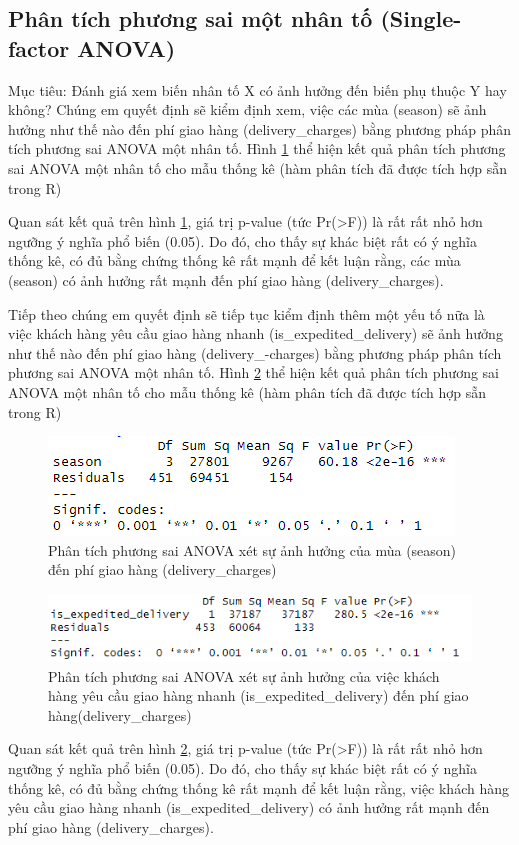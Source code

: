 \subsection{Phân tích phương sai một nhân tố (Single-factor ANOVA)} \label{anova1}
Mục tiêu: Đánh giá xem biến nhân tố X có ảnh hưởng đến biến phụ thuộc Y hay không?
Chúng em quyết định sẽ kiểm định xem, việc các mùa (season) sẽ ảnh hưởng như thế nào đến phí giao hàng (delivery\_charges) bằng
phương pháp phân tích phương sai ANOVA một nhân tố. Hình \ref{fig:5.1} thể hiện kết quả phân tích phương sai ANOVA một nhân tố cho mẫu thống kê (hàm phân tích đã được tích hợp sẵn trong R)

Quan sát kết quả trên hình \ref{fig:5.1}, giá trị p-value (tức Pr(>F)) là rất rất nhỏ hơn ngưỡng ý nghĩa phổ biến (0.05). Do đó, cho thấy sự
khác biệt rất có ý nghĩa thống kê, có đủ bằng chứng thống kê rất mạnh để kết luận rằng, các mùa (season) có ảnh hưởng rất mạnh đến phí giao hàng (delivery\_charges).

Tiếp theo chúng em quyết định sẽ tiếp tục kiểm định thêm một yếu tố nữa là việc khách hàng yêu cầu giao hàng nhanh (is\_expedited\_delivery) sẽ ảnh hưởng như thế nào đến phí giao hàng (delivery\_-charges) bằng phương pháp phân tích phương sai ANOVA một nhân tố. Hình \ref{fig:5.2} thể hiện kết quả phân tích phương sai ANOVA một nhân tố cho mẫu thống kê (hàm phân tích đã được tích hợp sẵn trong R)
\begin{figure}[!htbp]
    \centering
    \includegraphics[width=0.6\linewidth]{graphics/5.3.1.png}
    \caption{Phân tích phương sai ANOVA xét sự ảnh hưởng của mùa (season) đến phí giao hàng (delivery\_charges)}
    \label{fig:5.1}
\end{figure}

\begin{figure}[!htbp]
    \centering
    \includegraphics[width=0.7\linewidth]{graphics/5.3.2.png}
    \caption{Phân tích phương sai ANOVA xét sự ảnh hưởng của việc khách hàng yêu cầu giao hàng nhanh (is\_expedited\_delivery) đến phí giao hàng(delivery\_charges)}
    \label{fig:5.2}
\end{figure}

    Quan sát kết quả trên hình \ref{fig:5.2}, giá trị p-value (tức Pr(>F)) là rất rất nhỏ hơn ngưỡng ý nghĩa phổ biến (0.05). Do đó, cho thấy sự
khác biệt rất có ý nghĩa thống kê, có đủ bằng chứng thống kê rất mạnh để kết luận rằng, việc khách hàng yêu cầu giao hàng nhanh (is\_expedited\_delivery) có ảnh hưởng rất mạnh đến phí giao hàng (delivery\_charges).
